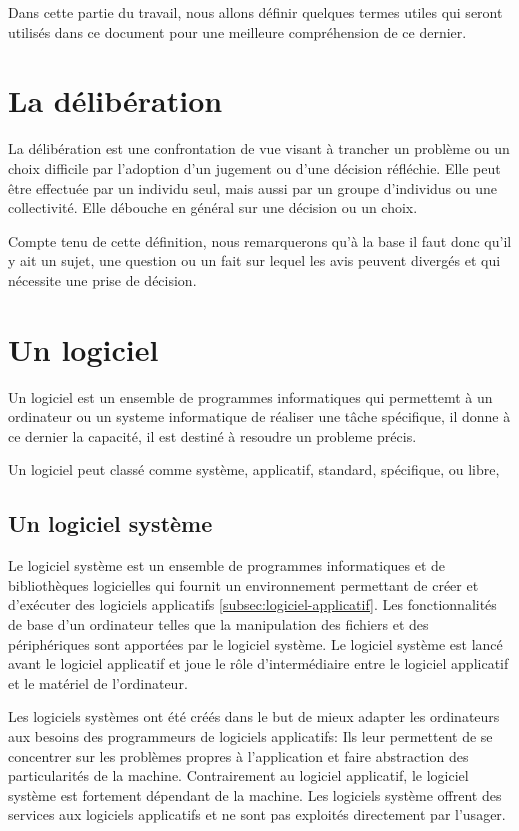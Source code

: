 Dans cette partie du travail, nous allons définir quelques termes utiles qui seront utilisés dans ce document
pour une meilleure compréhension de ce dernier.

\section{La délibération}\label{sec:deliberation}
La délibération \cite{deliberation} est une confrontation de vue
visant à trancher un problème ou un choix difficile par l'adoption d'un
jugement ou d'une décision réfléchie. Elle peut être effectuée par un individu seul,
mais aussi par un groupe d'individus ou une collectivité. Elle débouche en général sur
une décision ou un choix.

Compte tenu de cette définition, nous remarquerons qu'à la base il faut donc qu'il y ait
un sujet, une question ou un fait sur lequel les avis peuvent divergés et qui nécessite
une prise de décision.
\section{Un logiciel}\label{sec:application}
Un logiciel est un ensemble de programmes informatiques qui
permettemt à un ordinateur ou un systeme informatique de réaliser une t\^ache spécifique,
il donne à ce dernier la capacité, il est destiné à resoudre un probleme précis.

Un logiciel peut classé comme système, applicatif, standard, spécifique, ou libre,

\subsection{Un logiciel système}\label{subsec:logiciel-systeme}
Le logiciel système \cite{logiciel_systeme} est un ensemble de programmes informatiques et de bibliothèques logicielles
qui fournit un environnement permettant de créer et d'exécuter des logiciels applicatifs \ref{subsec:logiciel-applicatif}.
Les fonctionnalités de base d'un ordinateur telles que la manipulation des fichiers et
des périphériques sont apportées par le logiciel système. Le logiciel système est lancé avant le
logiciel applicatif et joue le rôle d'intermédiaire entre le logiciel applicatif et le matériel de
l'ordinateur.

Les logiciels systèmes ont été créés dans le but de mieux adapter les ordinateurs aux besoins des
programmeurs de logiciels applicatifs: Ils leur permettent de se concentrer sur les problèmes propres
à l'application et faire abstraction des particularités de la machine. Contrairement au logiciel
applicatif, le logiciel système est fortement dépendant de la machine. Les logiciels système offrent
des services aux logiciels applicatifs et ne sont pas exploités directement par l'usager.

